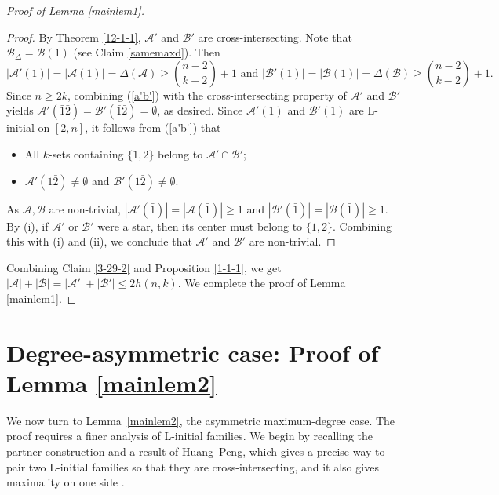 \documentclass[a4paper,11pt]{article}
\newcommand{\m}{\mathcal}
\begin{document}
\begin{proof}[Proof of Lemma \ref{mainlem1}]
\begin{proof}
By Theorem \ref{12-1-1}, $\mathcal{A}'$ and $\mathcal{B}'$ are cross-intersecting. 
Note that $\m B_{\Delta}=\m B(1)$ (see Claim \ref{samemaxd}). Then
\begin{equation}\label{a'b'}
    |\mathcal{A}'(1)|=|\mathcal{A}(1)|=\Delta(\mathcal{A})\ge {n-2\choose k-2}+1 \,\,\text{and}\,\, |\mathcal{B}'(1)|=|\mathcal{B}(1)|=\Delta(\mathcal{B})\ge {n-2\choose k-2}+1.
\end{equation}
Since $n\ge 2k$, 
combining (\ref{a'b'}) with the cross-intersecting property of $\m A'$ and $\m B'$ yields 
$\m A'(\bar1 \bar 2)=\m B'(\bar1 \bar 2)=\emptyset$, as desired.
Since $\mathcal{A}'(1)$ and $\mathcal{B}'(1)$ are L-initial on $[2,n]$, it follows from (\ref{a'b'}) that 
\begin{itemize}
    \item[(i)] All $k$-sets containing $\{1,2\}$ belong to $\m A' \cap \m B'$;
    \item[(ii)] $\m A'(1\bar 2)\ne \emptyset$ and $\m B'(1\bar 2)\ne \emptyset$. 
\end{itemize}
As $\m A, \m B$ are non-trivial, $|\m A'(\bar 1)|=|\m A(\bar1)|\ge 1$ and $|\m B'(\bar 1)|=|\m B(\bar1)|\ge 1$.
By (i), if $\m A'$ or $\m B'$ were a star, then its center must belong to $\{1,2\}$.
Combining this with (i) and (ii), we conclude that $\m A'$ and $\m B'$ are non-trivial. 
\end{proof}

Combining Claim \ref{3-29-2} and Proposition \ref{1-1-1}, we get $|\mathcal{A}|+|\mathcal{B}|=|\mathcal{A}'|+|\mathcal{B}'|\le 2h(n,k)$.
We complete the proof of Lemma \ref{mainlem1}.
\end{proof}



\section{Degree-asymmetric case: Proof of Lemma \ref{mainlem2}}\label{sec:asymmetric}
We now turn to Lemma~\ref{mainlem2}, the asymmetric maximum-degree case. The
proof requires a finer analysis of L-initial families. We begin
by recalling the partner construction and a result of Huang--Peng, which gives a precise way to pair two
L-initial families so that they are cross-intersecting, and it
also gives maximality on one side \cite{k_1+k_3}. 
\end{document}
